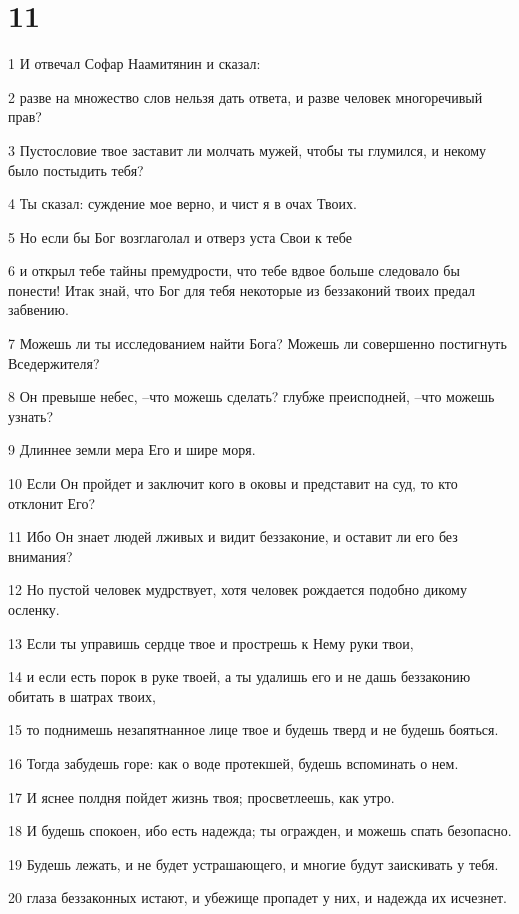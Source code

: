 \chapter{11}

\par 1 И отвечал Софар Наамитянин и сказал:
\par 2 разве на множество слов нельзя дать ответа, и разве человек многоречивый прав?
\par 3 Пустословие твое заставит ли молчать мужей, чтобы ты глумился, и некому было постыдить тебя?
\par 4 Ты сказал: суждение мое верно, и чист я в очах Твоих.
\par 5 Но если бы Бог возглаголал и отверз уста Свои к тебе
\par 6 и открыл тебе тайны премудрости, что тебе вдвое больше следовало бы понести! Итак знай, что Бог для тебя некоторые из беззаконий твоих предал забвению.
\par 7 Можешь ли ты исследованием найти Бога? Можешь ли совершенно постигнуть Вседержителя?
\par 8 Он превыше небес, --что можешь сделать? глубже преисподней, --что можешь узнать?
\par 9 Длиннее земли мера Его и шире моря.
\par 10 Если Он пройдет и заключит кого в оковы и представит на суд, то кто отклонит Его?
\par 11 Ибо Он знает людей лживых и видит беззаконие, и оставит ли его без внимания?
\par 12 Но пустой человек мудрствует, хотя человек рождается подобно дикому осленку.
\par 13 Если ты управишь сердце твое и прострешь к Нему руки твои,
\par 14 и если есть порок в руке твоей, а ты удалишь его и не дашь беззаконию обитать в шатрах твоих,
\par 15 то поднимешь незапятнанное лице твое и будешь тверд и не будешь бояться.
\par 16 Тогда забудешь горе: как о воде протекшей, будешь вспоминать о нем.
\par 17 И яснее полдня пойдет жизнь твоя; просветлеешь, как утро.
\par 18 И будешь спокоен, ибо есть надежда; ты огражден, и можешь спать безопасно.
\par 19 Будешь лежать, и не будет устрашающего, и многие будут заискивать у тебя.
\par 20 глаза беззаконных истают, и убежище пропадет у них, и надежда их исчезнет.

